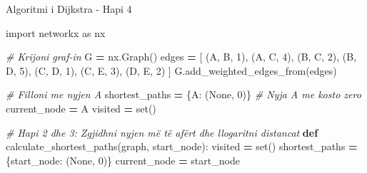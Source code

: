 \documentclass[
  ignorenonframetext,
]{beamer}
\newenvironment{Shaded}{\begin{snugshade}}{\end{snugshade}}
\newcommand{\BuiltInTok}[1]{#1}
\newcommand{\CommentTok}[1]{\textcolor[rgb]{0.56,0.35,0.01}{\textit{#1}}}
\newcommand{\DecValTok}[1]{\textcolor[rgb]{0.00,0.00,0.81}{#1}}
\newcommand{\ImportTok}[1]{#1}
\newcommand{\KeywordTok}[1]{\textcolor[rgb]{0.13,0.29,0.53}{\textbf{#1}}}
\newcommand{\NormalTok}[1]{#1}
\newcommand{\OperatorTok}[1]{\textcolor[rgb]{0.81,0.36,0.00}{\textbf{#1}}}
\newcommand{\StringTok}[1]{\textcolor[rgb]{0.31,0.60,0.02}{#1}}
\newcommand{\VariableTok}[1]{\textcolor[rgb]{0.00,0.00,0.00}{#1}}
\begin{document}
\begin{frame}[fragile]{Algoritmi i Dijkstra - Hapi 4}
\protect\hypertarget{algoritmi-i-dijkstra---hapi-4-1}{}

\begin{Shaded}
\begin{Highlighting}[]
\ImportTok{import}\NormalTok{ networkx }\ImportTok{as}\NormalTok{ nx}

\CommentTok{\# Krijoni graf{-}in}
\NormalTok{G }\OperatorTok{=}\NormalTok{ nx.Graph()}
\NormalTok{edges }\OperatorTok{=}\NormalTok{ [}
\NormalTok{    (}\StringTok{\textquotesingle{}A\textquotesingle{}}\NormalTok{, }\StringTok{\textquotesingle{}B\textquotesingle{}}\NormalTok{, }\DecValTok{1}\NormalTok{),}
\NormalTok{    (}\StringTok{\textquotesingle{}A\textquotesingle{}}\NormalTok{, }\StringTok{\textquotesingle{}C\textquotesingle{}}\NormalTok{, }\DecValTok{4}\NormalTok{),}
\NormalTok{    (}\StringTok{\textquotesingle{}B\textquotesingle{}}\NormalTok{, }\StringTok{\textquotesingle{}C\textquotesingle{}}\NormalTok{, }\DecValTok{2}\NormalTok{),}
\NormalTok{    (}\StringTok{\textquotesingle{}B\textquotesingle{}}\NormalTok{, }\StringTok{\textquotesingle{}D\textquotesingle{}}\NormalTok{, }\DecValTok{5}\NormalTok{),}
\NormalTok{    (}\StringTok{\textquotesingle{}C\textquotesingle{}}\NormalTok{, }\StringTok{\textquotesingle{}D\textquotesingle{}}\NormalTok{, }\DecValTok{1}\NormalTok{),}
\NormalTok{    (}\StringTok{\textquotesingle{}C\textquotesingle{}}\NormalTok{, }\StringTok{\textquotesingle{}E\textquotesingle{}}\NormalTok{, }\DecValTok{3}\NormalTok{),}
\NormalTok{    (}\StringTok{\textquotesingle{}D\textquotesingle{}}\NormalTok{, }\StringTok{\textquotesingle{}E\textquotesingle{}}\NormalTok{, }\DecValTok{2}\NormalTok{)}
\NormalTok{]}
\NormalTok{G.add\_weighted\_edges\_from(edges)}

\CommentTok{\# Filloni me nyjen \textquotesingle{}A\textquotesingle{}}
\NormalTok{shortest\_paths }\OperatorTok{=}\NormalTok{ \{}\StringTok{\textquotesingle{}A\textquotesingle{}}\NormalTok{: (}\VariableTok{None}\NormalTok{, }\DecValTok{0}\NormalTok{)\}  }\CommentTok{\# Nyja \textquotesingle{}A\textquotesingle{} me kosto zero}
\NormalTok{current\_node }\OperatorTok{=} \StringTok{\textquotesingle{}A\textquotesingle{}}
\NormalTok{visited }\OperatorTok{=} \BuiltInTok{set}\NormalTok{()}

\CommentTok{\# Hapi 2 dhe 3: Zgjidhni nyjen më të afërt dhe llogaritni distancat}
\KeywordTok{def}\NormalTok{ calculate\_shortest\_paths(graph, start\_node):}
\NormalTok{    visited }\OperatorTok{=} \BuiltInTok{set}\NormalTok{()}
\NormalTok{    shortest\_paths }\OperatorTok{=}\NormalTok{ \{start\_node: (}\VariableTok{None}\NormalTok{, }\DecValTok{0}\NormalTok{)\}}
\NormalTok{    current\_node }\OperatorTok{=}\NormalTok{ start\_node}


\end{Highlighting}
\end{Shaded}
\end{frame}
\end{document}
